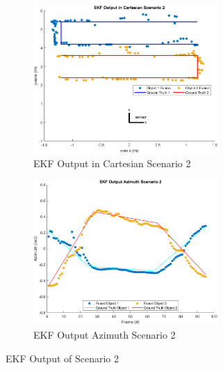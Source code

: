 \begin{figure}[!htb]
    \hspace{0.1\textwidth}
    \begin{subfigure}[b]{0.3\textwidth}%
        \includegraphics[width=7cm]{Figures/matlab/EKF Output in Cartesian Scenario 2.png}
        \caption{EKF Output in Cartesian Scenario 2}
        \label{subfig:ekf_cart_2}
    \end{subfigure}
    \hspace{0.15\textwidth}
    \begin{subfigure}[b]{0.3\textwidth}%
        \includegraphics[width=7cm]{Figures/matlab/EKF Output Azimuth Scenario 2.png}
        \caption{EKF Output Azimuth Scenario 2}
        \label{subfig:ekf_azi_2}
    \end{subfigure}

    \caption{EKF Output of Scenario 2}
    \label{fig:ekf_2}
\end{figure}

